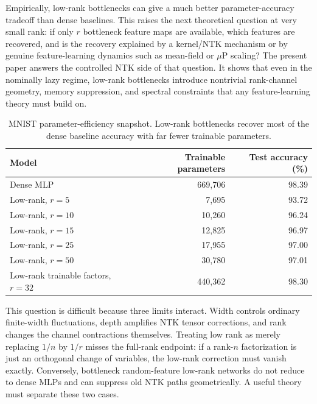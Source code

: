 \documentclass{article}
\begin{document}
Empirically, low-rank bottlenecks can give a much better parameter-accuracy tradeoff than dense baselines. This raises the next theoretical question at very small rank: if only \(r\) bottleneck feature maps are available, which features are recovered, and is the recovery explained by a kernel/NTK mechanism or by genuine feature-learning dynamics such as mean-field or \(\mu\)P scaling? The present paper answers the controlled NTK side of that question. It shows that even in the nominally lazy regime, low-rank bottlenecks introduce nontrivial rank-channel geometry, memory suppression, and spectral constraints that any feature-learning theory must build on.

\begin{table}[t]
\centering
\caption{MNIST parameter-efficiency snapshot. Low-rank bottlenecks recover most of the dense baseline accuracy with far fewer trainable parameters.}
\label{tab:intro-mnist-lowrank}
\begin{tabular}{lrr}
\toprule
Model & Trainable parameters & Test accuracy (\%) \\
\midrule
Dense MLP & 669,706 & 98.39 \\
Low-rank, \(r=5\) & 7,695 & 93.72 \\
Low-rank, \(r=10\) & 10,260 & 96.24 \\
Low-rank, \(r=15\) & 12,825 & 96.97 \\
Low-rank, \(r=25\) & 17,955 & 97.00 \\
Low-rank, \(r=50\) & 30,780 & 97.01 \\
Low-rank trainable factors, \(r=32\) & 440,362 & 98.30 \\
\bottomrule
\end{tabular}
\end{table}

This question is difficult because three limits interact. Width controls ordinary finite-width fluctuations, depth amplifies NTK tensor corrections, and rank changes the channel contractions themselves. Treating low rank as merely replacing \(1/n\) by \(1/r\) misses the full-rank endpoint: if a rank-\(n\) factorization is just an orthogonal change of variables, the low-rank correction must vanish exactly. Conversely, bottleneck random-feature low-rank networks do not reduce to dense MLPs and can suppress old NTK paths geometrically. A useful theory must separate these two cases.
\end{document}
